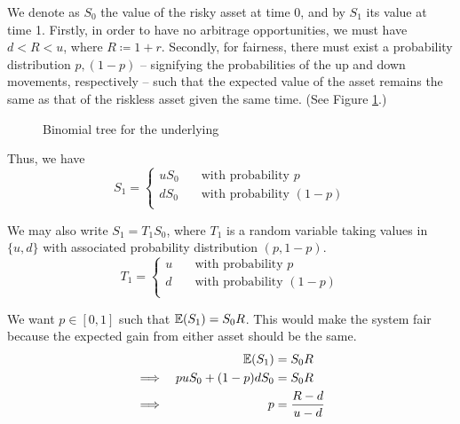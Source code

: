 We denote as $ S_0 $ the value of the risky asset at time 0, and by $ S_1 $ its value at time 1. Firstly, in order to have no arbitrage opportunities, we must have $ d < R < u $, where $ R \coloneqq 1 + r $. Secondly, for fairness, there must exist a probability distribution $ p, (1-p) $ -- signifying the probabilities of the up and down movements, respectively -- such that the expected value of the asset remains the same as that of the riskless asset given the same time. (See Figure \ref{fig:discrete-2tr-underlying}.)


\begin{figure}[h]
	
	\caption{Binomial tree for the underlying}
	\label{fig:discrete-2tr-underlying}
\end{figure}


Thus, we have
\begin{equation*}
	S_1 =
	\begin{cases}
		u S_0 & \quad \text{with probability } p \\
		d S_0 & \quad \text{with probability } (1 - p) \\		
	\end{cases}
\end{equation*}

We may also write $ S_1 = T_1 S_0 $, where $ T_1 $ is a random variable taking values in $ \{ u, d \} $ with associated probability distribution $ (p, 1-p) $.
\begin{equation*}
	T_1 =
	\begin{cases}
		u  & \quad \text{with probability } p \\
		d  & \quad \text{with probability } (1 - p) \\		
	\end{cases}
\end{equation*}


We want $ p \in [0,1] $ such that $ \operatorname{\mathbb{E}}(S_1) = S_0 R $. This would make the system fair because the expected gain from either asset should be the same.
\begin{alignat}{9}
	          &&  \operatorname{\mathbb{E}}(S_1) &= S_0 R \\
	\implies  &&   p u S_0 + ( 1 - p ) d S_0  & =  S_0 R \nonumber \\
	\implies  &&  p  & =  \frac{R - d}{u - d}    \label{eq:discrete-pr}
\end{alignat}

